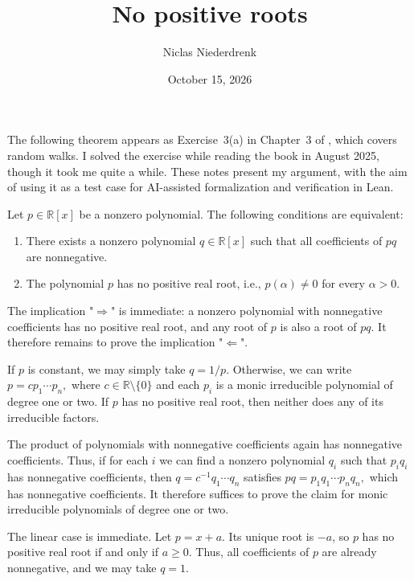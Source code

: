\documentclass[a4paper,11pt]{article}
\title{No positive roots} %
\author{Niclas Niederdrenk}
\date{October 15, 2026} %
\newcommand{\RR}{\mathbb{R}}
\begin{document}
	\maketitle
	
	
	
	The following theorem appears as Exercise~3(a) in Chapter~3 of \cite{Stanley2018}, which covers random walks. I solved the exercise while reading the book in August 2025, though it took me quite a while. These notes present my argument, with the aim of using it as a test case for AI-assisted formalization and verification in Lean.
	
	\begin{theorem}\label{main-theorem}
		Let $p \in \RR[x]$ be a nonzero polynomial. The following conditions
		are equivalent:
		\begin{enumerate}
			\item There exists a nonzero polynomial $q \in \RR[x]$ such that
			all coefficients of $pq$ are nonnegative.
			\item The polynomial $p$ has no positive real root, i.e.,
			$p(\alpha) \neq 0$ for every $\alpha > 0$.
		\end{enumerate}
	\end{theorem}
	
	The implication "$\Rightarrow$" is immediate: a nonzero polynomial with
	nonnegative coefficients has no positive real root, and any root of $p$
	is also a root of $pq$. It therefore remains to prove the implication
	"$\Leftarrow$".
	
	If $p$ is constant, we may simply take $q=1/p$. Otherwise, we can write
	$
	p=c p_1 \cdots p_n,
	$
	where $c\in\RR\setminus\{0\}$ and each $p_i$ is a monic irreducible
	polynomial of degree one or two. If $p$ has no positive real root, then
	neither does any of its irreducible factors.
	
	The product of polynomials with nonnegative coefficients again has
	nonnegative coefficients. Thus, if for each $i$ we can find a nonzero
	polynomial $q_i$ such that $p_iq_i$ has nonnegative coefficients, then
	$
	q=c^{-1}q_1 \cdots q_n
	$
	satisfies
	$
	pq=p_1q_1 \cdots p_nq_n,
	$
	which has nonnegative coefficients. It therefore suffices to prove the
	claim for monic irreducible polynomials of degree one or two.
	
	The linear case is immediate. Let $p=x+a$. Its unique root is $-a$,
	so $p$ has no positive real root if and only if $a\geq0$.
	Thus, all coefficients of $p$ are already nonnegative, and we may
	take $q=1$.
	
\end{document}
